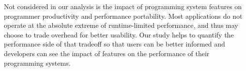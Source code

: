 Not considered in our analysis is the impact of programming system
features on programmer productivity and performance portability. Most
applications do not operate at the absolute extreme of runtime-limited
performance, and thus may choose to trade overhead for better
usability. Our study helps to quantify the performance side of that
tradeoff so that users can be better informed and developers can see
the impact of features on the performance of their programming
systems.
